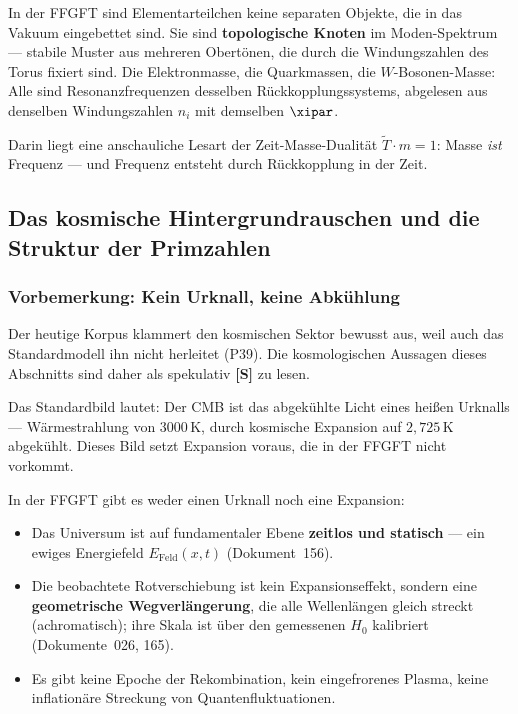 \begin{interpretation}
In der FFGFT sind Elementarteilchen keine separaten Objekte, die in das Vakuum
eingebettet sind. Sie sind \textbf{topologische Knoten} im Moden-Spektrum —
stabile Muster aus mehreren Obertönen, die durch die Windungszahlen des Torus
fixiert sind. Die Elektronmasse, die Quarkmassen, die $W$-Bosonen-Masse: Alle
sind Resonanzfrequenzen desselben Rückkopplungssystems, abgelesen aus denselben
Windungszahlen $n_i$ mit demselben $\xipar$.

Darin liegt eine anschauliche Lesart der Zeit-Masse-Dualität $\tilde{T} \cdot m = 1$:
Masse \emph{ist} Frequenz — und Frequenz entsteht durch Rückkopplung in der Zeit.
\end{interpretation}


\subsection{Das kosmische Hintergrundrauschen und die Struktur der Primzahlen}

\subsubsection*{Vorbemerkung: Kein Urknall, keine Abkühlung}

\begin{important}
Der heutige Korpus klammert den kosmischen Sektor bewusst aus, weil auch das
Standardmodell ihn nicht herleitet (P39). Die kosmologischen Aussagen dieses
Abschnitts sind daher als spekulativ \textbf{[S]} zu lesen.

Das Standardbild lautet: Der CMB ist das abgekühlte Licht eines
heißen Urknalls — Wärmestrahlung von $3000\,\text{K}$, durch kosmische
Expansion auf $2{,}725\,\text{K}$ abgekühlt. Dieses Bild setzt
Expansion voraus, die in der FFGFT nicht vorkommt.

In der FFGFT gibt es weder einen Urknall noch eine Expansion:
\begin{itemize}
    \item Das Universum ist auf fundamentaler Ebene \textbf{zeitlos und statisch}
    — ein ewiges Energiefeld $E_\text{Feld}(x,t)$ (Dokument~156).
    \item Die beobachtete Rotverschiebung ist kein Expansionseffekt, sondern
    eine \textbf{geometrische Wegverlängerung}, die alle Wellenlängen gleich
    streckt (achromatisch); ihre Skala ist über den gemessenen $H_0$ kalibriert
    (Dokumente~026, 165).
    \item Es gibt keine Epoche der Rekombination, kein eingefrorenes Plasma,
    keine inflationäre Streckung von Quantenfluktuationen.
\end{itemize}
\end{important}

